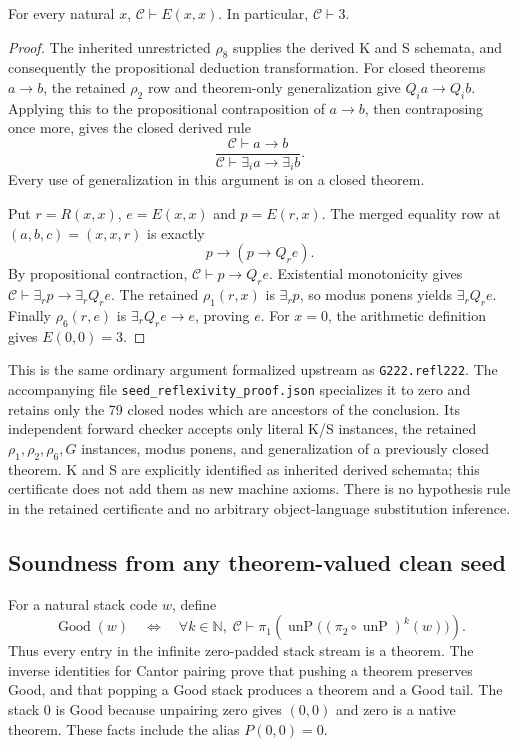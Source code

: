 \begin{lemma}
For every natural $x$, $\mathcal C\vdash E(x,x)$. In particular,
$\mathcal C\vdash 3$.
\end{lemma}
\begin{proof}
The inherited unrestricted $\rho_8$ supplies the derived K and S schemata,
and consequently the propositional deduction transformation. For closed
theorems $a\to b$, the retained $\rho_2$ row and theorem-only generalization
give $Q_i a\to Q_i b$. Applying this to the propositional contraposition
of $a\to b$, then contraposing once more, gives the closed derived rule
\[
 \frac{\mathcal C\vdash a\to b}
      {\mathcal C\vdash \exists_i a\to\exists_i b}.
\]
Every use of generalization in this argument is on a closed theorem.

Put $r=R(x,x)$, $e=E(x,x)$ and $p=E(r,x)$. The merged equality row at
$(a,b,c)=(x,x,r)$ is exactly
\[
 p\to(p\to Q_r e).
\]
By propositional contraction, $\mathcal C\vdash p\to Q_r e$.
Existential monotonicity gives
$\mathcal C\vdash \exists_r p\to\exists_r Q_r e$.
The retained $\rho_1(r,x)$ is $\exists_r p$, so modus ponens yields
$\exists_r Q_r e$. Finally $\rho_6(r,e)$ is
$\exists_r Q_r e\to e$, proving $e$.
For $x=0$, the arithmetic definition gives $E(0,0)=3$.
\end{proof}

This is the same ordinary argument formalized upstream as
\texttt{G222.refl222}. The accompanying file
\texttt{seed\_reflexivity\_proof.json} specializes it to zero and retains
only the 79 closed nodes which are ancestors of the conclusion. Its
independent forward checker accepts only literal K/S instances, the
retained $\rho_1,\rho_2,\rho_6,G$ instances, modus ponens, and
generalization of a previously closed theorem. K and S are explicitly
identified as inherited derived schemata; this certificate does not add
them as new machine axioms. There is no hypothesis rule in the retained
certificate and no arbitrary object-language substitution inference.

\subsection{Soundness from any theorem-valued clean seed}

For a natural stack code $w$, define
\[
 \operatorname{Good}(w)\quad\Longleftrightarrow\quad
 \forall k\in\mathbb N,\;
 \mathcal C\vdash
 \pi_1\!\left(\operatorname{unP}
       \bigl((\pi_2\circ\operatorname{unP})^k(w)\bigr)\right).
\]
Thus every entry in the infinite zero-padded stack stream is a theorem.
The inverse identities for Cantor pairing prove that pushing a theorem
preserves Good, and that popping a Good stack produces a theorem and a
Good tail. The stack $0$ is Good because unpairing zero gives $(0,0)$
and zero is a native theorem. These facts include the alias $P(0,0)=0$.

